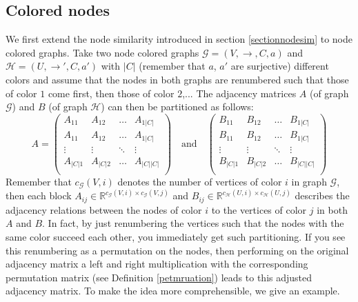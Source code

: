 \documentclass[a4paper,11pt]{report}
\newcommand{\R}{{\mathbb R}}
\newcommand{\graf}{\mathscr{G}}
\newcommand{\grafeen}{\mathscr{H}}
\begin{document}
\subsection{Colored nodes}
We first extend the node similarity introduced in section \ref{sectionnodesim} to 
node colored graphs. Take two node colored graphs $\graf=(V,\to, C, a)$ and $\grafeen=(U,\to', C, a')$ with $|C|$ (remember that $a$, $a'$ are surjective) different colors and assume that the nodes 
in both graphs are renumbered such that those of color $1$ come first, then 
those of color $2$,... The adjacency matrices $A$ (of graph $\graf$) and $B$ (of graph $\grafeen$) 
can then be partitioned as follows:
$$A = \begin{pmatrix}
A_{11} & A_{12} & \ldots & A_{1|C|}\\
A_{11} & A_{12} & \ldots & A_{1|C|}\\
\vdots & \vdots & \ddots & \vdots\\
A_{|C|1} & A_{|C|2} & \ldots & A_{|C||C|}\\
\end{pmatrix}
 \quad \text{and} \quad
 \begin{pmatrix}
B_{11} & B_{12} & \ldots & B_{1|C|}\\
B_{11} & B_{12} & \ldots & B_{1|C|}\\
\vdots & \vdots & \ddots & \vdots\\
B_{|C|1} & B_{|C|2} & \ldots & B_{|C||C|}\\
\end{pmatrix}$$
Remember that $c_\graf(V,i)$ denotes the number of vertices of color $i$ in graph $\graf$, then each block $A_{ij} \in \R^{c_\graf(V,i)\times c_\graf(V,j)}$ and $B_{ij} \in \R^{c_\grafeen(U,i)\times c_\grafeen(U,j)}$ 
describes the adjacency relations between the nodes of color $i$ to the vertices 
of color $j$ in both $A$ and $B$. In fact, by just renumbering the vertices such 
that the nodes with the same color succeed each other, you immediately get such 
partitioning. If you see this renumbering as a permutation on the nodes,
then performing on the original adjacency matrix a left and right multiplication with the corresponding permutation matrix (see Definition 
\ref{petmruation}) leads to this adjusted adjacency matrix.
To make the idea more comprehensible, we give an example.
\end{document}
